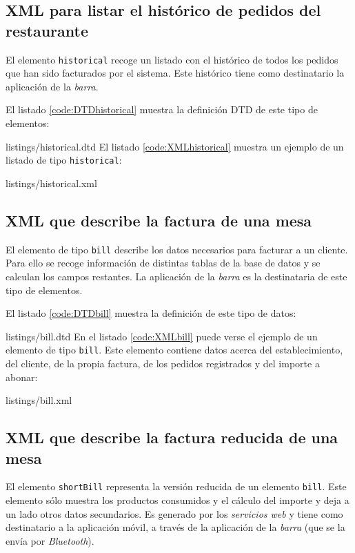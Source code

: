 \subsection{\acs{XML} para listar el histórico de pedidos del restaurante}
El elemento \texttt{historical} recoge un listado con el histórico de todos los 
pedidos que han sido facturados por el sistema. Este histórico tiene como
destinatario la aplicación de la \emph{barra}.

El listado \ref{code:DTDhistorical} muestra la definición \acs{DTD} de este 
tipo de elementos:

{listings/historical.dtd}
El listado \ref{code:XMLhistorical} muestra un ejemplo de un listado de tipo
\texttt{historical}:

{listings/historical.xml}

\subsection{\acs{XML} que describe la factura de una mesa}
El elemento de tipo \texttt{bill} describe los datos necesarios para
facturar a un cliente. Para ello se recoge información de distintas tablas
de la base de datos y se calculan los campos restantes. La aplicación de la
\emph{barra} es la destinataria de este tipo de elementos.

El listado \ref{code:DTDbill} muestra la definición de este tipo de datos:

{listings/bill.dtd}
En el listado \ref{code:XMLbill} puede verse el ejemplo de un elemento de tipo
\texttt{bill}. Este elemento contiene datos acerca del establecimiento, del
cliente, de la propia factura, de los pedidos registrados y del importe a
abonar:

{listings/bill.xml}

\subsection{\acs{XML} que describe la factura reducida de una mesa}
El elemento \texttt{shortBill} representa la versión reducida de un elemento
\texttt{bill}. Este elemento sólo muestra los productos consumidos y el
cálculo del importe y deja a un lado otros datos secundarios. Es generado por
los \emph{servicios web} y tiene como destinatario a la aplicación móvil, a
través de la aplicación de la \emph{barra} (que se la envía por
\emph{Bluetooth}).

